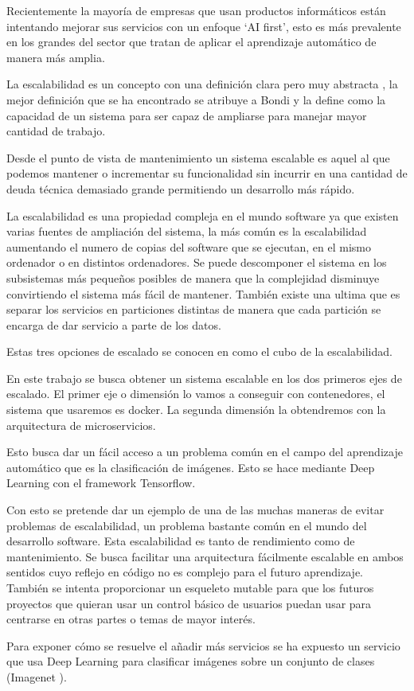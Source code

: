 Recientemente la mayoría de empresas que usan productos informáticos están intentando mejorar sus servicios con un enfoque `AI first', esto es más prevalente en los grandes del sector que  tratan de aplicar el aprendizaje automático de manera más amplia.

La escalabilidad es un concepto con una definición clara pero muy abstracta \cite{hill90}, la mejor definición que se ha encontrado se atribuye a Bondi \cite{bondi00} y la define como la capacidad de un sistema para ser capaz de ampliarse para manejar mayor cantidad de trabajo. 

Desde el punto de vista de mantenimiento un sistema escalable es aquel al que podemos mantener o incrementar su funcionalidad sin incurrir en una cantidad de deuda técnica demasiado grande permitiendo un desarrollo más rápido.

La escalabilidad es una propiedad compleja en el mundo software ya que existen varias fuentes de ampliación del sistema, la más común es la escalabilidad aumentando el numero de copias del software que se ejecutan, en el mismo ordenador o en distintos ordenadores. Se puede descomponer el sistema en los subsistemas más pequeños posibles de manera que la complejidad disminuye convirtiendo el sistema más fácil de mantener. También existe una ultima que es separar los servicios en particiones distintas de manera que cada partición se encarga de dar servicio a parte de los datos.

Estas tres opciones de escalado se conocen en \cite{scala09} como el cubo de la escalabilidad. 

En este trabajo se busca obtener un sistema escalable en los dos primeros ejes de escalado. El primer eje o dimensión lo vamos a conseguir con contenedores, el sistema que usaremos es docker. La segunda dimensión la obtendremos con la arquitectura de microservicios. 

Esto busca dar un fácil acceso a un problema común en el campo del aprendizaje automático que es la clasificación de imágenes. Esto se hace mediante Deep Learning con el framework Tensorflow.

Con esto se pretende dar un ejemplo de una de las muchas maneras de evitar problemas de escalabilidad, un problema bastante común en el mundo del desarrollo software. Esta escalabilidad es tanto de rendimiento como de mantenimiento. Se busca facilitar una arquitectura fácilmente escalable en ambos sentidos cuyo reflejo en código no es complejo para el futuro aprendizaje. También se intenta proporcionar un esqueleto mutable para que los futuros proyectos que quieran usar un control básico de usuarios puedan usar para centrarse en otras partes o temas de mayor interés.

Para exponer cómo se resuelve el añadir más servicios se ha expuesto un servicio que usa Deep Learning para clasificar imágenes sobre un conjunto de clases (Imagenet \cite{imnet}).